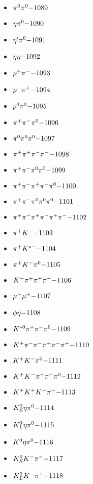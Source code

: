 \begin{multicols}{3}
\begin{itemize}
 \item $ \pi^{0} \pi^{0} \hfill{-1089}$
 \item $ \eta \pi^{0} \hfill{-1090}$
 \item $ {\eta^{\prime}} \pi^{0} \hfill{-1091}$
 \item $ \eta \eta \hfill{-1092}$
 \item $ \rho^{+} \pi^{-} \hfill{-1093}$
 \item $ \rho^{-} \pi^{+} \hfill{-1094}$
 \item $ \rho^{0} \pi^{0} \hfill{-1095}$
 \item $ \pi^{+} \pi^{-} \pi^{0} \hfill{-1096}$
 \item $ \pi^{0} \pi^{0} \pi^{0} \hfill{-1097}$
 \item $ \pi^{+} \pi^{+} \pi^{-} \pi^{-} \hfill{-1098}$
 \item $ \pi^{+} \pi^{-} \pi^{0} \pi^{0} \hfill{-1099}$
 \item $ \pi^{+} \pi^{-} \pi^{+} \pi^{-} \pi^{0} \hfill{-1100}$
 \item $ \pi^{+} \pi^{-} \pi^{0} \pi^{0} \pi^{0} \hfill{-1101}$
 \item $ \pi^{+} \pi^{-} \pi^{+} \pi^{-} \pi^{+} \pi^{-} \hfill{-1102}$
 \item $ \pi^{+} K^{-} \hfill{-1103}$
 \item $ \pi^{+} K^{*-} \hfill{-1104}$
 \item $ \pi^{+} K^{-} \pi^{0} \hfill{-1105}$
 \item $ K^{-} \pi^{+} \pi^{+} \pi^{-} \hfill{-1106}$
 \item $ \mu^{-} \mu^{+} \hfill{-1107}$
 \item $ \phi \eta \hfill{-1108}$
 \item $ K^{*0} \pi^{+} \pi^{-} \pi^{0} \hfill{-1109}$
 \item $ K^{+} \pi^{-} \pi^{-} \pi^{+} \pi^{-} \pi^{+} \hfill{-1110}$
 \item $ K^{+} K^{-} \pi^{0} \hfill{-1111}$
 \item $ K^{+} K^{-} \pi^{+} \pi^{-} \pi^{0} \hfill{-1112}$
 \item $ K^{+} K^{+} K^{-} \pi^{-} \hfill{-1113}$
 \item $ K_{S}^{0} \eta \pi^{0} \hfill{-1114}$
 \item $ K_{L}^{0} \eta \pi^{0} \hfill{-1115}$
 \item $ K^{0} \eta \pi^{0} \hfill{-1116}$
 \item $ K_{S}^{0} K^{-} \pi^{+} \hfill{-1117}$
 \item $ K_{L}^{0} K^{-} \pi^{+} \hfill{-1118}$

\end{itemize}
\end{multicols}
